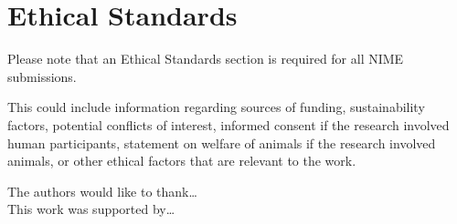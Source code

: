 \documentclass[acmsmall]{nimeart}
\begin{document}
\section{Ethical Standards}

Please note that an Ethical Standards section is required for all NIME submissions.

This could include information regarding sources of funding, sustainability factors, potential conflicts of interest,  informed consent if the research involved human participants, statement on welfare of animals if the research involved animals, or other ethical factors that are relevant to the work.

\begin{acks}
The authors would like to thank\ldots
\\
This work was supported by\ldots
\end{acks}



\end{document}
